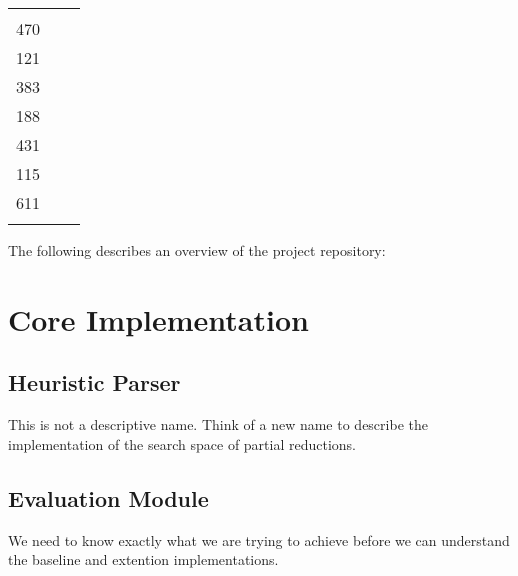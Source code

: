 \documentclass[12pt,a4paper,twoside,openright]{report}
\begin{document}
\begin{table}[!t]
\begin{tabularx}{\textwidth}{l X c}
\begin{minipage}[t]{8cm}
  \end{minipage} & 
  \begin{minipage}[t]{0.5cm}
    2272
    \vspace{0.1\DTbaselineskip}\\
    470\\
    \vspace{\DTbaselineskip}
    121\\
    \vspace{\DTbaselineskip}
    383\\
    \vspace{1.8\DTbaselineskip}
    188\\
    \vspace{3.7\DTbaselineskip}
    431\\
    \vspace{3\DTbaselineskip}
    115\\
    \vspace{2.5\DTbaselineskip}
    611\\
  \end{minipage}
\end{tabularx}
\end{table}

The following describes an overview of the project repository:

\section{Core Implementation}

\subsection{Heuristic Parser}
This is not a descriptive name. Think of a new name to describe the implementation of the search space of partial reductions.

\subsection{Evaluation Module}
We need to know exactly what we are trying to achieve before we can understand the baseline and extention implementations.
\end{document}
